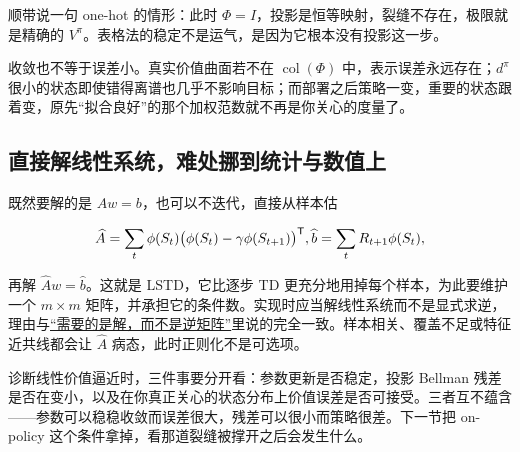 顺带说一句 one-hot 的情形：此时 \(\Phi=I\)，投影是恒等映射，裂缝不存在，极限就是精确的 \(V^\pi\)。表格法的稳定不是运气，是因为它根本没有投影这一步。

收敛也不等于误差小。真实价值曲面若不在 \(\operatorname{col}(\Phi)\) 中，表示误差永远存在；\(d^\pi\) 很小的状态即使错得离谱也几乎不影响目标；而部署之后策略一变，重要的状态跟着变，原先``拟合良好''的那个加权范数就不再是你关心的度量了。

\subsection{直接解线性系统，难处挪到统计与数值上}

既然要解的是 \(Aw=b\)，也可以不迭代，直接从样本估

\[
\widehat A=\sum_t\phi(S_t)\bigl(\phi(S_t)-\gamma\phi(S_{t+1})\bigr)^{\mathsf{T}},
\space
\widehat b=\sum_tR_{t+1}\phi(S_t),
\]

再解 \(\widehat Aw=\widehat b\)。这就是 LSTD，它比逐步 TD 更充分地用掉每个样本，为此要维护一个 \(m\times m\) 矩阵，并承担它的条件数。实现时应当解线性系统而不是显式求逆，理由与\hyperref[sec:08-Numerical-Analysis/07-Numerical-Methods-for-ML/03]{``需要的是解，而不是逆矩阵''}里说的完全一致。样本相关、覆盖不足或特征近共线都会让 \(\widehat A\) 病态，此时正则化不是可选项。

诊断线性价值逼近时，三件事要分开看：参数更新是否稳定，投影 Bellman 残差是否在变小，以及在你真正关心的状态分布上价值误差是否可接受。三者互不蕴含——参数可以稳稳收敛而误差很大，残差可以很小而策略很差。下一节把 on-policy 这个条件拿掉，看那道裂缝被撑开之后会发生什么。
